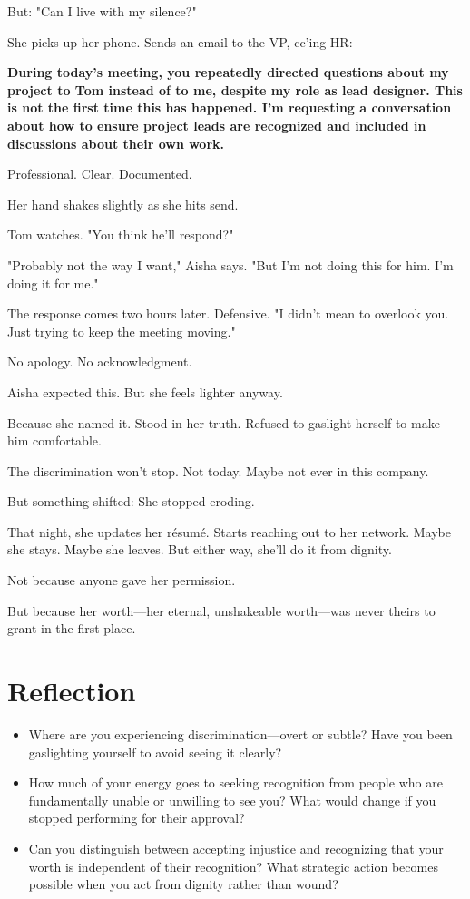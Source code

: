 \documentclass[11pt,twoside]{book}
\begin{document}
But: "Can I live with my silence?"

She picks up her phone. Sends an email to the VP, cc'ing HR:

\textbf{During today's meeting, you repeatedly directed questions about my project to Tom instead of to me, despite my role as lead designer. This is not the first time this has happened. I'm requesting a conversation about how to ensure project leads are recognized and included in discussions about their own work.}

Professional. Clear. Documented.

Her hand shakes slightly as she hits send.

Tom watches. "You think he'll respond?"

"Probably not the way I want," Aisha says. "But I'm not doing this for him. I'm doing it for me."

The response comes two hours later. Defensive. "I didn't mean to overlook you. Just trying to keep the meeting moving."

No apology. No acknowledgment.

Aisha expected this. But she feels lighter anyway.

Because she named it. Stood in her truth. Refused to gaslight herself to make him comfortable.

The discrimination won't stop. Not today. Maybe not ever in this company.

But something shifted: She stopped eroding.

That night, she updates her résumé. Starts reaching out to her network. Maybe she stays. Maybe she leaves. But either way, she'll do it from dignity.

Not because anyone gave her permission.

But because her worth—her eternal, unshakeable worth—was never theirs to grant in the first place.

\section*{Reflection}

\begin{itemize}
\item Where are you experiencing discrimination—overt or subtle? Have you been gaslighting yourself to avoid seeing it clearly?
\item How much of your energy goes to seeking recognition from people who are fundamentally unable or unwilling to see you? What would change if you stopped performing for their approval?
\item Can you distinguish between accepting injustice and recognizing that your worth is independent of their recognition? What strategic action becomes possible when you act from dignity rather than wound?
\end{itemize}
\end{document}
